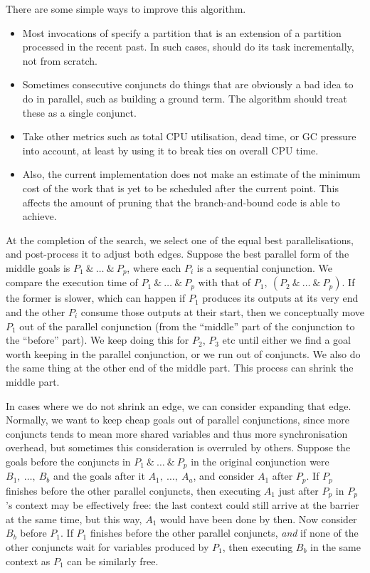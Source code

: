 There are some simple ways to improve this algorithm.

\begin{itemize}
\item
Most invocations of \findpartime specify a partition
that is an extension of a partition processed in the recent past.
In such cases, \findpartime should do its task
incrementally, not from scratch.
\item
Sometimes consecutive conjuncts do things that are
obviously a bad idea to do in parallel, such as building a ground term.
The algorithm should treat these as a single conjunct.
\item
Take other metrics such as total CPU utilisation, dead time, or GC pressure
into account,
at least by using it to break ties on overall CPU time.
\item
Also, the current implementation does not make an estimate of the
minimum cost of the work that is yet to be scheduled after the current point.
This affects the amount of pruning that the branch-and-bound code
is able to achieve.
\end{itemize}

\noindent
At the completion of the search,
we select one of the equal best parallelisations,
and post-process it to adjust both edges.
Suppose the best parallel form of the middle goals is $P_1~\&~\ldots~\&~P_p$,
where each $P_i$ is a sequential conjunction.
We compare the execution time of $P_1~\&~\ldots~\&~P_p$
with that of $P_1,~(P_2~\&~\ldots~\&~P_p)$.
If the former is slower,
which can happen if $P_1$ produces its outputs at its very end
and the other $P_i$ consume those outputs at their start,
then we conceptually move $P_1$ out of the parallel conjunction
(from the ``middle'' part of the conjunction to the ``before'' part).
We keep doing this for $P_2$, $P_3$ etc until either
we find a goal worth keeping in the parallel conjunction,
or we run out of conjuncts.
We also do the same thing at the other end of the middle part.
This process can shrink the middle part.

In cases where we do not shrink an edge, we can consider expanding that edge.
Normally, we want to keep cheap goals out of parallel conjunctions,
since more conjuncts tends to mean
more shared variables and thus more synchronisation overhead,
but sometimes this consideration is overruled by others.
Suppose the goals before the conjuncts in $P_1~\&~\ldots~\&~P_p$
in the original conjunction were $B_1,~\ldots,~B_b$
and the goals after it $A_1,~\ldots,~A_a$,
and consider $A_1$ after $P_p$.
If $P_p$ finishes before the other parallel conjuncts,
then executing $A_1$ just after $P_p$ in $P_p$'s context
may be effectively free:
the last context could still arrive at the barrier at the same time,
but this way, $A_1$ would have been done by then.
Now consider $B_b$ before $P_1$.
If $P_1$ finishes before the other parallel conjuncts,
\emph{and} if none of the other conjuncts wait for variables produced by $P_1$,
then executing $B_b$ in the same context as $P_1$ can be similarly free.

